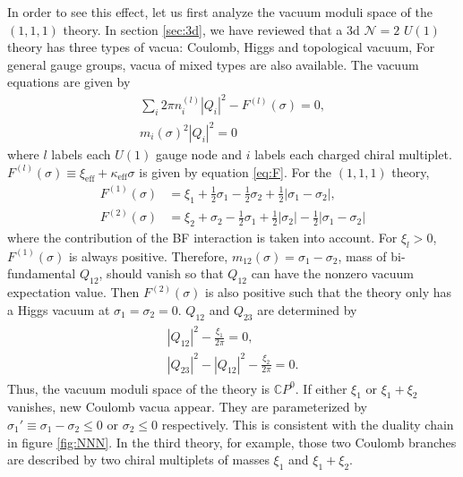 \documentclass[a4paper,11pt]{article}
\begin{document}
In order to see this effect, let us first analyze the vacuum moduli space of the $(1,1,1)$ theory. In section \ref{sec:3d}, we have reviewed that a 3d $\mathcal N = 2$ $U(1)$ theory has three types of vacua: Coulomb, Higgs and topological vacuum, For general gauge groups, vacua of mixed types are also available. The vacuum equations are given by
\begin{gather}
\sum_i 2 \pi n^{(l)}_i |Q_i|^2-F^{(l)} (\sigma) = 0, \\
m_i (\sigma)^2 |Q_i|^2 = 0
\end{gather}
where $l$ labels each $U(1)$ gauge node and $i$ labels each charged chiral multiplet. $F^{(l)} (\sigma) \equiv \xi_\text{eff}+\kappa_\text{eff} \sigma$ is given by equation \eqref{eq:F}. For the $(1,1,1)$ theory,
\begin{align}
F^{(1)} (\sigma) &= \xi_1+\frac{1}{2} \sigma_1-\frac{1}{2} \sigma_2+\frac{1}{2} |\sigma_1-\sigma_2|, \\
F^{(2)} (\sigma) &= \xi_2+\sigma_2-\frac{1}{2} \sigma_1+\frac{1}{2} |\sigma_2|-\frac{1}{2} |\sigma_1-\sigma_2|
\end{align}
where the contribution of the BF interaction is taken into account. For $\xi_l > 0$, $F^{(1)} (\sigma)$ is always positive. Therefore, $m_{12} (\sigma) = \sigma_1-\sigma_2$, mass of bi-fundamental $Q_{12}$, should vanish so that $Q_{12}$ can have the nonzero vacuum expectation value. Then $F^{(2)} (\sigma)$ is also positive such that the theory only has a Higgs vacuum at $\sigma_1 = \sigma_2 = 0$. $Q_{12}$ and $Q_{23}$ are determined by
\begin{gather}
\begin{gathered}
|Q_{12}|^2-\frac{\xi_1}{2 \pi} = 0, \\
|Q_{23}|^2-|Q_{12}|^2-\frac{\xi_2}{2 \pi} = 0.
\end{gathered}
\end{gather}
Thus, the vacuum moduli space of the theory is $\mathbb CP^0$. If either $\xi_1$ or $\xi_1+\xi_2$ vanishes, new Coulomb vacua appear. They are parameterized by $\sigma_1' \equiv \sigma_1-\sigma_2 \leq 0$ or $\sigma_2 \leq 0$ respectively. This is consistent with the duality chain in figure \ref{fig:NNN}. In the third theory, for example, those two Coulomb branches are described by two chiral multiplets of masses $\xi_1$ and $\xi_1+\xi_2$.
\end{document}
